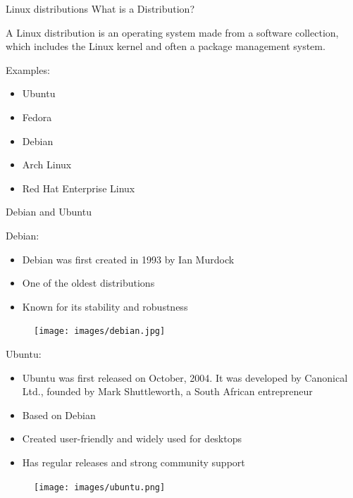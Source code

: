 \documentclass{beamer}
\begin{document}
\begin{frame}{Linux distributions}
  What is a Distribution?

  A Linux distribution is an operating system made from a software collection, which includes the Linux kernel and often a package management system.

  Examples:
  \begin{itemize}
    \item Ubuntu
    \item Fedora
    \item Debian
    \item Arch Linux
    \item Red Hat Enterprise Linux
  \end{itemize}
\end{frame}

\begin{frame}{Debian and Ubuntu}
  \begin{minipage}[t]{0.65\textwidth}
    Debian:
    \begin{itemize}
      \item Debian was first created in 1993 by Ian Murdock
      \item One of the oldest distributions
      \item Known for its stability and robustness
    \end{itemize}
  \end{minipage}
  \hfill
  \begin{minipage}[t]{0.3\textwidth}
    \begin{figure}[h]
      \texttt{[image: images/debian.jpg]}
    \end{figure}
  \end{minipage}

  \begin{minipage}[t]{0.65\textwidth}
    Ubuntu:
    \begin{itemize}
      \item Ubuntu was first released on October, 2004. It was developed by Canonical Ltd., founded by Mark Shuttleworth, a South African entrepreneur
      \item Based on Debian
      \item Created user-friendly and widely used for desktops
      \item Has regular releases and strong community support
    \end{itemize}
  \end{minipage}
  \hfill
  \begin{minipage}[t]{0.3\textwidth}
    \begin{figure}[h]
      \texttt{[image: images/ubuntu.png]}
    \end{figure}
  \end{minipage}
\end{frame}
\end{document}
